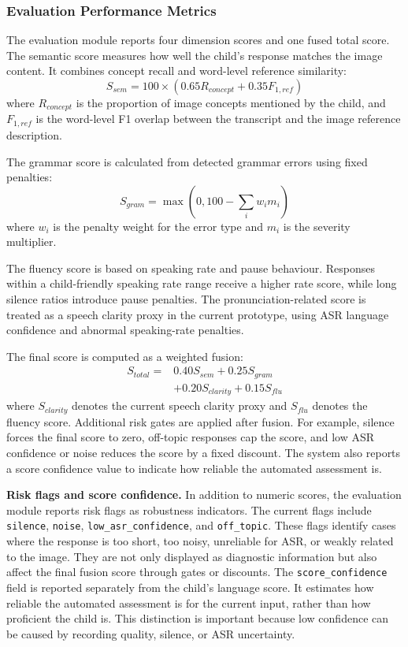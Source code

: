 \documentclass{article}
\begin{document}
\subsubsection{Evaluation Performance Metrics}
The evaluation module reports four dimension scores and one fused total score. The semantic score measures how well the child's response matches the image content. It combines concept recall and word-level reference similarity:
\begin{equation}
S_{sem} = 100 \times (0.65 R_{concept} + 0.35 F_{1,ref})
\end{equation}
where $R_{concept}$ is the proportion of image concepts mentioned by the child, and $F_{1,ref}$ is the word-level F1 overlap between the transcript and the image reference description.

The grammar score is calculated from detected grammar errors using fixed penalties:
\begin{equation}
S_{gram} = \max(0, 100 - \sum_i w_i m_i)
\end{equation}
where $w_i$ is the penalty weight for the error type and $m_i$ is the severity multiplier.

The fluency score is based on speaking rate and pause behaviour. Responses within a child-friendly speaking rate range receive a higher rate score, while long silence ratios introduce pause penalties. The pronunciation-related score is treated as a speech clarity proxy in the current prototype, using ASR language confidence and abnormal speaking-rate penalties.

The final score is computed as a weighted fusion:
\begin{equation}
\begin{split}
S_{total} ={}& 0.40S_{sem} + 0.25S_{gram} \\
& + 0.20S_{clarity} + 0.15S_{flu}
\end{split}
\end{equation}
where $S_{clarity}$ denotes the current speech clarity proxy and $S_{flu}$ denotes the fluency score. Additional risk gates are applied after fusion. For example, silence forces the final score to zero, off-topic responses cap the score, and low ASR confidence or noise reduces the score by a fixed discount. The system also reports a score confidence value to indicate how reliable the automated assessment is.

\noindent\textbf{Risk flags and score confidence.}
In addition to numeric scores, the evaluation module reports risk flags as robustness indicators. The current flags include \texttt{silence}, \texttt{noise}, \texttt{low\_asr\_confidence}, and \texttt{off\_topic}. These flags identify cases where the response is too short, too noisy, unreliable for ASR, or weakly related to the image. They are not only displayed as diagnostic information but also affect the final fusion score through gates or discounts.
The \texttt{score\_confidence} field is reported separately from the child's language score. It estimates how reliable the automated assessment is for the current input, rather than how proficient the child is. This distinction is important because low confidence can be caused by recording quality, silence, or ASR uncertainty.
\end{document}
